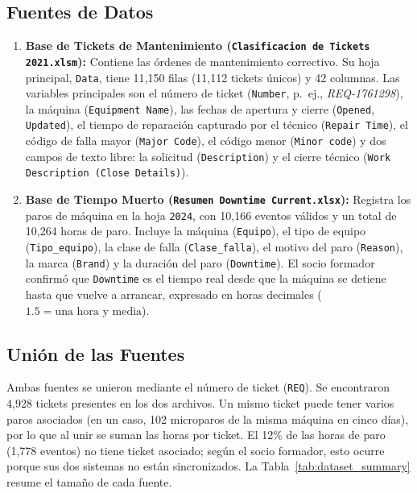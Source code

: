 \documentclass[conference]{IEEEtran}
\begin{document}
\subsection{Fuentes de Datos}
\begin{enumerate}
    \item \textbf{Base de Tickets de Mantenimiento (\texttt{Clasificacion de Tickets 2021.xlsm}):} Contiene las órdenes de mantenimiento correctivo. Su hoja principal, \texttt{Data}, tiene 11,150 filas (11,112 tickets únicos) y 42 columnas. Las variables principales son el número de ticket (\texttt{Number}, p.~ej., \textit{REQ-1761298}), la máquina (\texttt{Equipment Name}), las fechas de apertura y cierre (\texttt{Opened}, \texttt{Updated}), el tiempo de reparación capturado por el técnico (\texttt{Repair Time}), el código de falla mayor (\texttt{Major Code}), el código menor (\texttt{Minor code}) y dos campos de texto libre: la solicitud (\texttt{Description}) y el cierre técnico (\texttt{Work Description (Close Details)}).
    
    \item \textbf{Base de Tiempo Muerto (\texttt{Resumen Downtime Current.xlsx}):} Registra los paros de máquina en la hoja \texttt{2024}, con 10,166 eventos válidos y un total de 10,264 horas de paro. Incluye la máquina (\texttt{Equipo}), el tipo de equipo (\texttt{Tipo\_equipo}), la clase de falla (\texttt{Clase\_falla}), el motivo del paro (\texttt{Reason}), la marca (\texttt{Brand}) y la duración del paro (\texttt{Downtime}). El socio formador confirmó que \texttt{Downtime} es el tiempo real desde que la máquina se detiene hasta que vuelve a arrancar, expresado en horas decimales ($1.5 = \text{una hora y media}$).
\end{enumerate}

\subsection{Unión de las Fuentes}
Ambas fuentes se unieron mediante el número de ticket (\texttt{REQ}). Se encontraron 4,928 tickets presentes en los dos archivos. Un mismo ticket puede tener varios paros asociados (en un caso, 102 microparos de la misma máquina en cinco días), por lo que al unir se suman las horas por ticket. El 12\% de las horas de paro (1,778 eventos) no tiene ticket asociado; según el socio formador, esto ocurre porque sus dos sistemas no están sincronizados. La Tabla~\ref{tab:dataset_summary} resume el tamaño de cada fuente.
\end{document}
